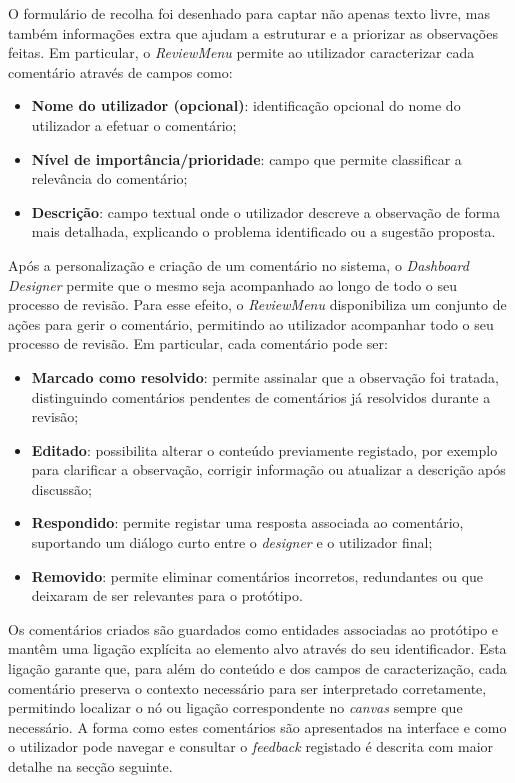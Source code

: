 O formulário de recolha foi desenhado para captar não apenas texto livre, mas também informações extra que ajudam a estruturar e a priorizar as observações feitas. Em particular, o \textit{ReviewMenu} permite ao utilizador caracterizar cada comentário através de campos como:

\begin{itemize}
    \item \textbf{Nome do utilizador (opcional)}: identificação opcional do nome do utilizador a efetuar o comentário;
    \item \textbf{Nível de importância/prioridade}: campo que permite classificar a relevância do comentário;
    \item \textbf{Descrição}: campo textual onde o utilizador descreve a observação de forma mais detalhada, explicando o problema identificado ou a sugestão proposta.
\end{itemize}

Após a personalização e criação de um comentário no sistema, o \textit{Dashboard Designer} permite que o mesmo seja acompanhado ao longo de todo o seu processo de revisão. Para esse efeito, o \textit{ReviewMenu} disponibiliza um conjunto de ações para gerir o comentário, permitindo ao utilizador acompanhar todo o seu processo de revisão. Em particular, cada comentário pode ser:

\begin{itemize}
    \item \textbf{Marcado como resolvido}: permite assinalar que a observação foi tratada, distinguindo comentários pendentes de comentários já resolvidos durante a revisão;
    \item \textbf{Editado}: possibilita alterar o conteúdo previamente registado, por exemplo para clarificar a observação, corrigir informação ou atualizar a descrição após discussão;
    \item \textbf{Respondido}: permite registar uma resposta associada ao comentário, suportando um diálogo curto entre o \textit{designer} e o utilizador final;
    \item \textbf{Removido}: permite eliminar comentários incorretos, redundantes ou que deixaram de ser relevantes para o protótipo.
\end{itemize}

Os comentários criados são guardados como entidades associadas ao protótipo e mantêm uma ligação explícita ao elemento alvo através do seu identificador. Esta ligação garante que, para além do conteúdo e dos campos de caracterização, cada comentário preserva o contexto necessário para ser interpretado corretamente, permitindo localizar o nó ou ligação correspondente no \textit{canvas} sempre que necessário. A forma como estes comentários são apresentados na interface e como o utilizador pode navegar e consultar o \textit{feedback} registado é descrita com maior detalhe na secção seguinte.

